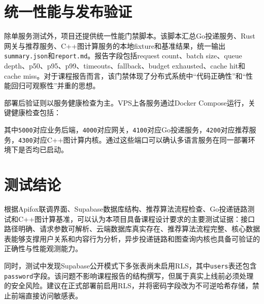 \section{统一性能与发布验证}

除单服务测试外，项目还提供统一性能门禁脚本。该脚本汇总Go投递服务、Rust网关与推荐服务、C++图计算服务的本地fixture和基准结果，统一输出\texttt{summary.json}和\texttt{report.md}。报告字段包括request count、batch size、queue depth、p50、p95、p99、timeouts、fallback、budget exhausted、cache hit和cache miss。对于课程报告而言，该门禁体现了分布式系统中“代码正确性”和“性能回归可观察性”并重的思想。

部署后验证则以服务健康检查为主。VPS上各服务通过Docker Compose运行，关键健康检查包括：


其中\texttt{5000}对应业务后端，\texttt{4000}对应网关，\texttt{4100}对应Go投递服务，\texttt{4200}对应推荐服务，\texttt{4300}对应C++图计算内核。通过这些端口可以确认多语言服务在同一部署环境下是否均已启动。

\section{测试结论}

根据Apifox联调界面、Supabase数据库结构、推荐算法流程检查、Go投递链路测试和C++图计算基准，可以认为本项目具备课程设计要求的主要测试证据：接口路径明确、请求参数可解析、云端数据库真实存在、推荐算法流程完整、核心数据表能够支撑用户关系和内容行为分析，异步投递链路和图查询内核也具备可验证的正确性与性能观测能力。

同时，测试中发现Supabase公开模式下多张表尚未启用RLS，其中\texttt{users}表还包含\texttt{password}字段。该问题不影响课程报告的结构撰写，但属于真实上线前必须处理的安全风险。建议在正式部署前启用RLS，并将密码字段改为不可逆哈希存储，禁止前端直接访问敏感表。
